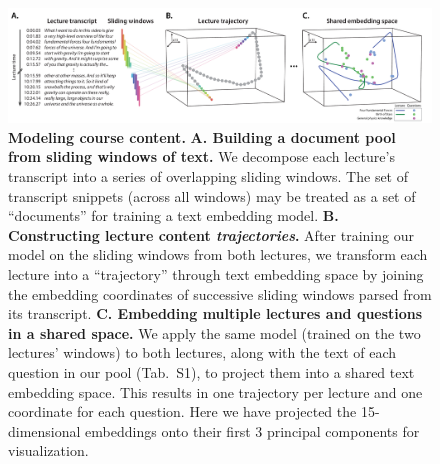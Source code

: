 \documentclass[10pt]{article}
\newcommand{\questions}{S1}
\begin{document}
\begin{figure}[tp]
\centering
\includegraphics[width=\textwidth]{figs/sliding_windows}

\caption{\textbf{Modeling course content.} \textbf{A.
Building a document pool from sliding windows of text.} We decompose each
lecture's transcript into a series of overlapping sliding windows. The set of
transcript snippets (across all windows) may be treated as a set of
``documents'' for training a text embedding model. \textbf{B. Constructing lecture content \textit{trajectories}.}  After training our model on the sliding windows from both lectures, we transform each lecture into a ``trajectory'' through text embedding space by joining the embedding coordinates of successive
sliding windows parsed from its transcript. \textbf{C. Embedding multiple lectures and
questions in a shared space.} We apply the same model (trained on the two lectures' windows) to both lectures, along with the text of each question in our pool (Tab.~\questions), to project them into a shared text embedding space. This results in one trajectory per lecture and one coordinate for each question. Here we have projected the 15-dimensional embeddings onto their first 3 principal components for visualization.}
\label{fig:sliding-windows}
\end{figure}
\end{document}
